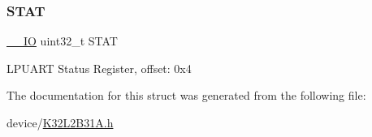 \subsubsection{\texorpdfstring{STAT}{STAT}}
{\footnotesize\ttfamily \mbox{\hyperlink{core__cm0plus_8h_aec43007d9998a0a0e01faede4133d6be}{\+\_\+\+\_\+\+IO}} uint32\+\_\+t S\+T\+AT}

L\+P\+U\+A\+RT Status Register, offset\+: 0x4 

The documentation for this struct was generated from the following file\+:\begin{DoxyCompactItemize}
\item 
device/\mbox{\hyperlink{_k32_l2_b31_a_8h}{K32\+L2\+B31\+A.\+h}}\end{DoxyCompactItemize}
